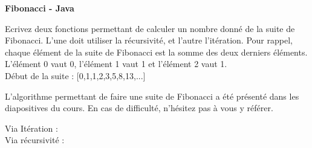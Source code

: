 	\begin{Exercice}[15 minutes] \textbf{Fibonacci - Java} 
	
	Ecrivez deux fonctions permettant de calculer un nombre donné de la suite de Fibonacci. L'une doit utiliser la récursivité, et l'autre l'itération. Pour rappel, chaque élément de la suite de Fibonacci est la somme des deux derniers éléments. L'élément 0 vaut 0, l'élément 1 vaut 1 et l'élément 2 vaut 1. \\
	
	Début de la suite : [0,1,1,2,3,5,8,13,...]
	  
	
		\begin{conseil} 
			L'algorithme permettant de faire une suite de Fibonacci a été présenté dans les diapositives du cours. En cas de difficulté, n'hésitez pas à vous y référer.
		\end{conseil} 
	
		\begin{solution}
			Via Itération : \\
			
				 
				
			Via récursivité : \\
			
				
		\end{solution} 
	
	\end{Exercice}
    
    


